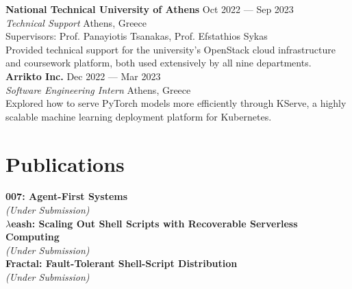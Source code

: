 \documentclass[margin, 12pt]{resume}
\newcommand{\cvName}{Nikos Pagonas}
\newcommand{\sectionVSpace}{\vspace{-3.5ex}} %
\newcommand{\authors}[1]{#1\xspace}
\newcommand{\equalContributionNote}{(*equal contribution)\xspace}
\newcommand{\fellowship}[1]{\textbf{#1}\xspace}
\newcommand{\institution}[1]{\textbf{#1}\xspace}
\newcommand{\interval}[2]{#1 --- #2\xspace}
\newcommand{\ordinal}[1]{\textsuperscript{#1}\xspace}
\newcommand{\rSection}[1]{\sectionVSpace\section{#1}\xspace}
\newcommand{\paperTitle}[1]{\textbf{#1}\xspace}
\newcommand{\place}[1]{#1\xspace}
\newcommand{\role}[1]{\textit{#1}\xspace}
\newcommand{\stitle}[1]{#1:\xspace}
\newcommand{\underSubmission}{\textit{(Under Submission)}\xspace}
\newcommand{\venue}[1]{\textit{#1}\xspace}
\begin{document}
\begin{resume}
    \institution{National Technical University of Athens} \hfill \interval{Oct 2022}{Sep 2023} \\
    \role{Technical Support} \hfill \place{Athens, Greece} \\
    \stitle{Supervisors} Prof. Panayiotis Tsanakas, Prof. Efstathios Sykas \\
    Provided technical support for the university's OpenStack cloud infrastructure and coursework platform, both used extensively by all nine departments. \\

    \institution{Arrikto Inc.} \hfill \interval{Dec 2022}{Mar 2023} \\
    \role{Software Engineering Intern} \hfill \place{Athens, Greece} \\
    Explored how to serve PyTorch models more efficiently through KServe, a highly scalable machine learning deployment platform for Kubernetes. \\



    \rSection{Publications}

    \newcommand{\me}{\textbf{\cvName}\xspace}

    \paperTitle{007: Agent-First Systems} \\
    \underSubmission \\

    \paperTitle{\( \lambda \)eash: Scaling Out Shell Scripts with Recoverable Serverless Computing} \\
    \underSubmission \\

    \paperTitle{Fractal: Fault-Tolerant Shell-Script Distribution} \\
    \underSubmission \\


\end{resume}
\end{document}
